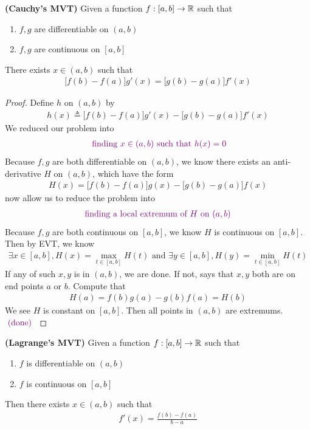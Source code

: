 \documentclass{report}
\begin{document}
\begin{theorem}
\label{CMVT}
\textbf{(Cauchy's MVT)} Given a function $f:[a,b]\to \mathbb{R}$ such that  
\begin{enumerate}[label=(\alph*)]
  \item $f,g$ are  differentiable on $(a,b)$
  \item $f,g$ are continuous on $[a,b]$
\end{enumerate}
There exists $x \in (a,b)$ such that 
 \begin{align*}
   \big[f(b)-f(a) \big]g'(x)=\big[g(b)-g(a) \big]f'(x)
\end{align*}
\end{theorem}
\begin{proof}
Define $h$ on  $(a,b)$ by 
\begin{align*}
h(x)\triangleq \big[f(b)-f(a)\big]g'(x)-\big[g(b)-g(a)\big]f'(x)
\end{align*}
We reduced our problem into 
\begin{align*}
  \textcolor{violet}{\text{ finding $x \in (a,b)$ such that } h(x)=0}
\end{align*}
Because $f,g$ are both differentiable on  $(a,b)$, we know there exists an anti-derivative $H$ on  $(a,b)$, which have the form 
\begin{align*}
H(x)=\big[f(b) -f(a)\big]g(x)-\big[g(b)-g(a) \big]f(x)
\end{align*}
 now allow us to reduce the problem into 
\begin{align*}
  \textcolor{violet}{\text{ finding a local extremum of $H$ on  $(a,b)$ }}
\end{align*}
Because $f,g$ are both continuous  on  $[a,b]$, we know $H$ is continuous on $[a,b]$. Then by EVT, we know 
 \begin{align*}
\exists x \in [a,b] , H(x)=\max_{t \in [a,b]}H(t)\text{ and }\exists y \in [a,b], H(y)=\min_{t \in [a,b]}H(t)
\end{align*}
If any of such $x,y$ is in $(a,b)$, we are done. If not, says that $x,y$ both are on end points $a$ or  $b$. Compute that 
\begin{align*}
H(a)=f(b)g(a)-g(b)f(a)=H(b)
\end{align*}
We see $H$ is constant on  $[a,b]$. Then all points in $(a,b)$ are extremums. $\textcolor{violet}{\text{ (done) }}$
\end{proof}
\begin{corollary}
\label{MVT}
\textbf{(Lagrange's MVT)} Given a function $f:[a,b]\rightarrow \mathbb{R}$ such that 
\begin{enumerate}[label=(\alph*)]
  \item $f$ is differentiable on  $(a,b)$ 
  \item $f$ is continuous on  $[a,b]$
\end{enumerate}
Then there exists $x \in (a,b)$ such that 
\begin{align*}
f'(x)=\frac{f(b)-f(a)}{b-a}
\end{align*}
\end{corollary}
\end{document}
